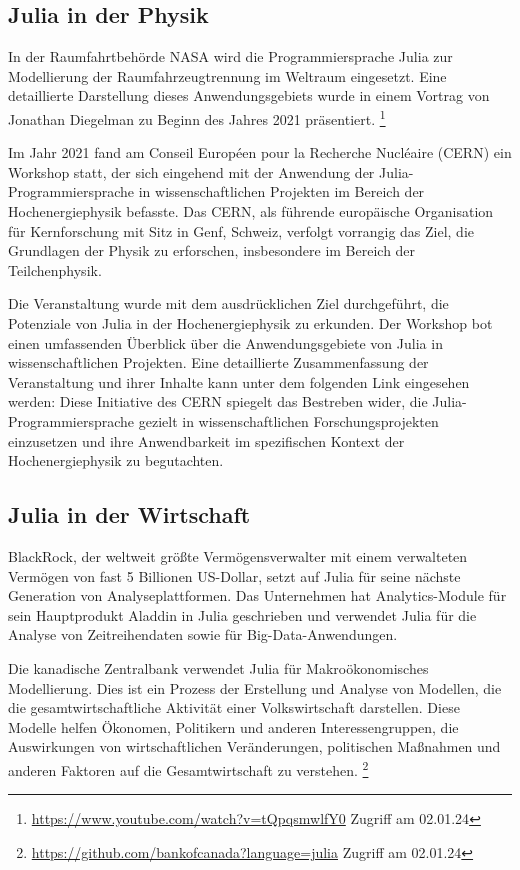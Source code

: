 \subsection{Julia in der Physik}
In der Raumfahrtbehörde NASA wird die Programmiersprache Julia zur Modellierung der Raumfahrzeugtrennung im Weltraum eingesetzt. Eine detaillierte Darstellung dieses Anwendungsgebiets wurde in einem Vortrag von Jonathan Diegelman zu Beginn des Jahres 2021 präsentiert. \footnote{\url{https://www.youtube.com/watch?v=tQpqsmwlfY0} Zugriff am 02.01.24} \newline


Im Jahr 2021 fand am Conseil Européen pour la Recherche Nucléaire (CERN) ein Workshop statt, der sich eingehend mit der Anwendung der Julia-Programmiersprache in wissenschaftlichen Projekten im Bereich der Hochenergiephysik befasste. Das CERN, als führende europäische Organisation für Kernforschung mit Sitz in Genf, Schweiz, verfolgt vorrangig das Ziel, die Grundlagen der Physik zu erforschen, insbesondere im Bereich der Teilchenphysik. \newline

Die Veranstaltung wurde mit dem ausdrücklichen Ziel durchgeführt, die Potenziale von Julia in der Hochenergiephysik zu erkunden. Der Workshop bot einen umfassenden Überblick über die Anwendungsgebiete von Julia in wissenschaftlichen Projekten. Eine detaillierte Zusammenfassung der Veranstaltung und ihrer Inhalte kann unter dem folgenden Link eingesehen werden: Diese Initiative des CERN spiegelt das Bestreben wider, die Julia-Programmiersprache gezielt in wissenschaftlichen Forschungsprojekten einzusetzen und ihre Anwendbarkeit im spezifischen Kontext der Hochenergiephysik zu begutachten.\cite{HEP_Mini_workshop}

\newpage
\subsection{Julia in der Wirtschaft}

BlackRock, der weltweit größte Vermögensverwalter mit einem verwalteten Vermögen von fast 5 Billionen US-Dollar, setzt auf Julia für seine nächste Generation von Analyseplattformen. 
Das Unternehmen hat Analytics-Module für sein Hauptprodukt Aladdin in Julia geschrieben und verwendet Julia für die Analyse von Zeitreihendaten sowie für Big-Data-Anwendungen.\cite{juliaconBlackrock} \newline

Die kanadische Zentralbank verwendet Julia für Makroökonomisches Modellierung.
Dies ist ein Prozess der Erstellung und Analyse von Modellen, die die gesamtwirtschaftliche Aktivität einer Volkswirtschaft darstellen. Diese Modelle helfen Ökonomen, Politikern und anderen Interessengruppen, die Auswirkungen von wirtschaftlichen Veränderungen, politischen Maßnahmen und anderen Faktoren auf die Gesamtwirtschaft zu verstehen. \footnote{\url{https://github.com/bankofcanada?language=julia} Zugriff am 02.01.24}


